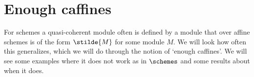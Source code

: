 \section{Enough caffines}
For schemes a quasi-coherent module often is defined
by a module that over affine schemes is of the form $\stilde{M}$
for some module $M$. We will look how often this generalizes,
which we will do through the notion of `enough caffines'.
We will see some examples where it does not work as in $\schemes$ 
and some results about when it does.










%